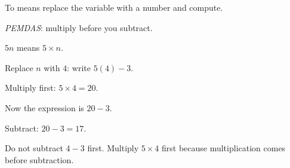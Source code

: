 \begin{words}
  \item To means replace the variable with a number and compute.
  \item \textit{PEMDAS}: multiply before you subtract.
  \item $5n$ means $5 \times n$.
\end{words}

\begin{steps}
  \item Replace $n$ with $4$: write $5(4) - 3$.
  \item Multiply first: $5 \times 4 = 20$.
  \item Now the expression is $20 - 3$.
  \item Subtract: $20 - 3 = 17$.
\end{steps}


\noindent Do not subtract $4 - 3$ first. Multiply $5 \times 4$ first because
multiplication comes before subtraction.

